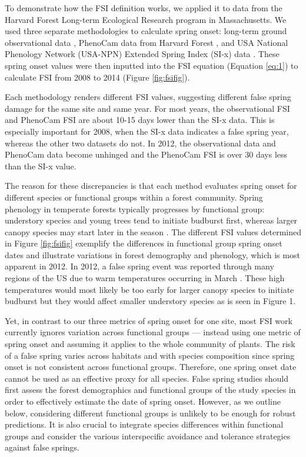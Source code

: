 \documentclass{article}\usepackage[]{graphicx}\usepackage[]{color}
\begin{document}
To demonstrate how the FSI definition works, we applied it to data from the Harvard Forest Long-term Ecological Research program in Massachusetts. We used three separate methodologies to calculate spring onset: long-term ground observational data \citep{Okeefe2014}, PhenoCam data from Harvard Forest \citep{Richardson2015}, and USA National Phenology Network (USA-NPN) Extended Spring Index (SI-x) data \citep{USA-NPN2016}. These spring onset values were then inputted into the FSI equation (Equation \ref{eq:1}) to calculate FSI from 2008 to 2014 (Figure \ref{fig:fsifig}). 

Each methodology renders different FSI values, suggesting different false spring damage for the same site and same year. For most years, the observational FSI and PhenoCam FSI are about 10-15 days lower than the SI-x data. This is especially important for 2008, when the SI-x data indicates a false spring year, whereas the other two datasets do not. In 2012, the observational data and PhenoCam data become unhinged and the PhenoCam FSI is over 30 days less than the SI-x value.

The reason for these discrepancies is that each method evaluates spring onset for different species or functional groups within a forest community. Spring phenology in temperate forests typically progresses by functional group: understory species and young trees tend to initiate budburst first, whereas larger canopy species may start later in the season \citep{Richardson2009, Xin2016}. The different FSI values determined in Figure \ref{fig:fsifig} exemplify the differences in functional group spring onset dates and illustrate variations in forest demography and phenology, which is most apparent in 2012. In 2012, a false spring event was reported through many regions of the US due to warm temperatures occurring in March \citep{Ault2015}. These high temperatures would most likely be too early for larger canopy species to initiate budburst but they would affect smaller understory species as is seen in Figure 1. 

Yet, in contrast to our three metrics of spring onset for one site, most FSI work currently ignores variation across functional groups --- instead using one metric of spring onset and assuming it applies to the whole community of plants. The risk of a false spring varies across habitats and with species composition since spring onset is not consistent across functional groups. Therefore, one spring onset date cannot be used as an effective proxy for all species. False spring studies should first assess the forest demographics and functional groups of the study species in order to effectively estimate the date of spring onset. However, as we outline below, considering different functional groups is unlikely to be enough for robust predictions. It is also crucial to integrate species differences within functional groups and consider the various interspecific avoidance and tolerance strategies against false springs. %
\end{document}
